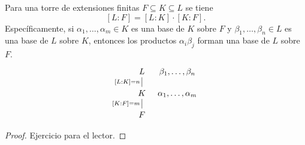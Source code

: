 \begin{proposicion}
  \label{prop:base-de-una-cadena-de-extensiones}
  Para una torre de extensiones finitas $F \subseteq K \subseteq L$ se tiene
  $$[L : F] = [L : K] \cdot [K : F].$$
  Específicamente, si $\alpha_1,\ldots,\alpha_m \in K$ es una base de $K$ sobre
  $F$ y $\beta_1,\ldots,\beta_n \in L$ es una base de $L$ sobre $K$, entonces
  los productos $\alpha_i\beta_j$ forman una base de $L$ sobre $F$.
  \[ \begin{tikzcd}[column sep=0.2cm,row sep=1em]
    L \ar[-]{d}[swap]{[L:K] = n} & \beta_1,\ldots,\beta_n \\
    K \ar[-]{d}[swap]{[K:F] = m} & \alpha_1,\ldots,\alpha_m \\
    F
  \end{tikzcd} \]

  \begin{proof}
    Ejercicio para el lector.
\iffalse
    Todo elemento de $L$ puede ser escrito como $\sum_j b_j\,\beta_j$ para
    algunos $b_1,\ldots,b_n \in K$. Luego, los coeficientes $b_j$ pueden ser
    expresados como $b_j = \sum_i a_{ij}\,\alpha_i$ para $a_{ij} \in F$.
    Se sigue que los productos $\alpha_i\beta_j$ generan a $L$ como un espacio
    vectorial sobre $F$. Para ver que esta es una base, hay que ver que los
    elementos $\alpha_i\beta_j$ son linealmente independientes.
    Si $\sum_{i,j} a_{ij} \alpha_i \beta_j = 0$, entonces se tiene
    $\sum_j b_j\,\beta_j = 0$, de donde $b_j = 0$ para todo $j$ por la
    independencia lineal de los $\beta_j$. Pero la independencia lineal de los
    $\alpha_i$ implica entonces que $a_{ij} = 0$ para todo $i$.
\fi
  \end{proof}
\end{proposicion}

